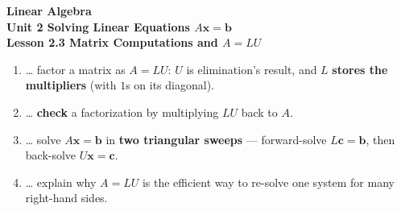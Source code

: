 \documentclass[10pt]{article}
\begin{document}
\vspace{-0.8in}

\begin{center}
  {\color{white}\textbf{\LARGE Linear Algebra}}\\[4pt]
  {\color{blushmid}\large\textbf{Unit 2 \quad Solving Linear Equations $A\mathbf{x}=\mathbf{b}$}}\\[6pt]
  {\color{white}\textbf{\large Lesson 2.3 \quad Matrix Computations and $A=LU$}}
\end{center}

\vspace{0.22in}
\namedateperiod
\vspace{0.18in}

\begin{learningtargetbox}
\small
\begin{enumerate}[leftmargin=1.5em, itemsep=5pt]
  \item \ldots{} factor a matrix as $A=LU$: $U$ is elimination's result, and $L$ \textbf{stores the multipliers} (with $1$s on its diagonal).
  \item \ldots{} \textbf{check} a factorization by multiplying $LU$ back to $A$.
  \item \ldots{} solve $A\mathbf{x}=\mathbf{b}$ in \textbf{two triangular sweeps} --- forward-solve $L\mathbf{c}=\mathbf{b}$, then back-solve $U\mathbf{x}=\mathbf{c}$.
  \item \ldots{} explain why $A=LU$ is the efficient way to re-solve one system for many right-hand sides.
\end{enumerate}
\end{learningtargetbox}

\vspace{0.14in}
\end{document}
